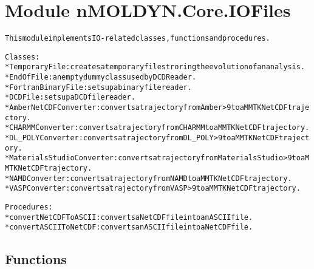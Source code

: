 %
%
%


\section{Module nMOLDYN.Core.IOFiles}

    \label{nMOLDYN:Core:IOFiles}
\begin{alltt}
This module implements IO-related classes, functions and procedures.

Classes:
    * TemporaryFile            : creates a temporary file stroring the evolution of an analysis.
    * EndOfFile                : an empty dummy class used by {\textbar}DCDReader{\textbar}.
    * FortranBinaryFile        : sets up a binary file reader.
    * DCDFile                  : sets up a DCD file reader.
    * AmberNetCDFConverter     : converts a trajectory from Amber {\textgreater} 9 to a MMTK NetCDF trajectory.
    * CHARMMConverter          : converts a trajectory from CHARMM to a MMTK NetCDF trajectory.
    * DL\_POLYConverter         : converts a trajectory from DL\_POLY {\textgreater} 9 to a MMTK NetCDF trajectory.
    * MaterialsStudioConverter : converts a trajectory from MaterialsStudio {\textgreater} 9 to a MMTK NetCDF trajectory.
    * NAMDConverter            : converts a trajectory from NAMD to a MMTK NetCDF trajectory.
    * VASPConverter            : converts a trajectory from VASP {\textgreater} 9 to a MMTK NetCDF trajectory.
        
Procedures:
    * convertNetCDFToASCII: converts a NetCDF file into an ASCII file.
    * convertASCIIToNetCDF: converts an ASCII file into a NetCDF file.
\end{alltt}



  \subsection{Functions}

